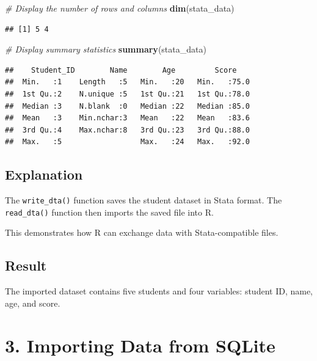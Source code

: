 \documentclass[
]{article}
\newenvironment{Shaded}{\begin{snugshade}}{\end{snugshade}}
\newcommand{\CommentTok}[1]{\textcolor[rgb]{0.56,0.35,0.01}{\textit{#1}}}
\newcommand{\FunctionTok}[1]{\textcolor[rgb]{0.13,0.29,0.53}{\textbf{#1}}}
\newcommand{\NormalTok}[1]{#1}
\begin{document}
\begin{Shaded}
\begin{Highlighting}[]
\CommentTok{\# Display the number of rows and columns}
\FunctionTok{dim}\NormalTok{(stata\_data)}
\end{Highlighting}
\end{Shaded}

\begin{verbatim}
## [1] 5 4
\end{verbatim}

\begin{Shaded}
\begin{Highlighting}[]
\CommentTok{\# Display summary statistics}
\FunctionTok{summary}\NormalTok{(stata\_data)}
\end{Highlighting}
\end{Shaded}

\begin{verbatim}
##    Student_ID        Name        Age         Score     
##  Min.   :1    Length   :5   Min.   :20   Min.   :75.0  
##  1st Qu.:2    N.unique :5   1st Qu.:21   1st Qu.:78.0  
##  Median :3    N.blank  :0   Median :22   Median :85.0  
##  Mean   :3    Min.nchar:3   Mean   :22   Mean   :83.6  
##  3rd Qu.:4    Max.nchar:8   3rd Qu.:23   3rd Qu.:88.0  
##  Max.   :5                  Max.   :24   Max.   :92.0
\end{verbatim}

\subsection{Explanation}\label{explanation-1}

The \texttt{write\_dta()} function saves the student dataset in Stata
format. The \texttt{read\_dta()} function then imports the saved file
into R.

This demonstrates how R can exchange data with Stata-compatible files.

\subsection{Result}\label{result-1}

The imported dataset contains five students and four variables: student
ID, name, age, and score.

\section{3. Importing Data from
SQLite}\label{importing-data-from-sqlite}
\end{document}
